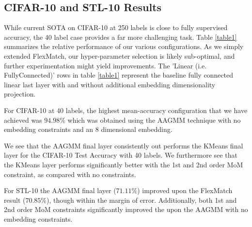 \documentclass[10pt,twocolumn,letterpaper]{article}
\begin{document}
\subsection{CIFAR-10 and STL-10 Results}

While current SOTA on CIFAR-10 at 250 labels is close to fully supervised accuracy, the 40 label case provides a far more challenging task. 
Table \ref{table1} summarizes the relative performance of our various configurations.
As we simply extended FlexMatch, our hyper-parameter selection is likely sub-optimal, and further experimentation might yield improvements.
The 'Linear (i.e. FullyConnected)' rows in table \ref{table1} represent the baseline fully connected linear last layer with and without additional embedding dimensionality projection.

For CIFAR-10 at 40 labels, the highest mean-accuracy configuration that we have achieved was $94.98\%$ which was obtained using the AAGMM technique with no embedding constraints and an 8 dimensional embedding.

We see that the AAGMM final layer consistently out performs the KMeans final layer for the CIFAR-10 Test Accuracy with 40 labels.  
We furthermore see that the KMeans layer performs significantly better with the 1st and 2nd order MoM constraint, as compared with no constraints.  

For STL-10 the AAGMM final layer ($71.11\%$) improved upon the FlexMatch \cite{zhang2021flexmatch} result ($70.85\%$), though within the margin of error.
Additionally, both 1st and 2nd order MoM constraints significantly improved the upon the AAGMM with no embedding constraints. 
\end{document}
